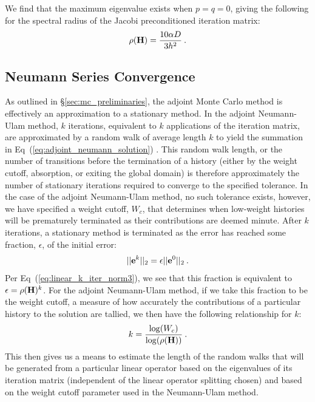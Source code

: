 We find that the maximum eigenvalue exists when $p=q=0$, giving the
following for the spectral radius of the Jacobi preconditioned
iteration matrix:
\begin{equation}
  \rho(\mathbf{H}) = \frac{10 \alpha D}{3 h^2}\:.
  \label{eq:iteration_radius}
\end{equation}

\clearpage 

\subsection{Neumann Series Convergence }
\label{subsec:neumann_convergence}
As outlined in \S\ref{sec:mc_preliminaries}, the adjoint Monte Carlo
method is effectively an approximation to a stationary method. In the
adjoint Neumann-Ulam method, $k$ iterations, equivalent to $k$
applications of the iteration matrix, are approximated by a random
walk of average length $k$ to yield the summation in
Eq~(\ref{eq:adjoint_neumann_solution})
\citep{dimov_new_1998,danilov_asymptotic_2000}. This random walk
length, or the number of transitions before the termination of a
history (either by the weight cutoff, absorption, or exiting the
global domain) is therefore approximately the number of stationary
iterations required to converge to the specified tolerance. In the
case of the adjoint Neumann-Ulam method, no such tolerance exists,
however, we have specified a weight cutoff, $W_c$, that determines
when low-weight histories will be prematurely terminated as their
contributions are deemed minute. After $k$ iterations, a stationary
method is terminated as the error has reached some fraction,
$\epsilon$, of the initial error:
\begin{equation}
  ||\mathbf{e}^{k}||_2 = \epsilon ||\mathbf{e}^0||_2\:.
  \label{eq:linear_k_iter_norm4}
\end{equation}
Per Eq~(\ref{eq:linear_k_iter_norm3}), we see that this fraction is
equivalent to $\epsilon = \rho(\mathbf{H})^k$. For the adjoint
Neumann-Ulam method, if we take this fraction to be the weight cutoff,
a measure of how accurately the contributions of a particular history
to the solution are tallied, we then have the following relationship
for $k$:
\begin{equation}
  k = \frac{ \log(W_c) }{ \log( \rho(\mathbf{H}) ) }\:.
  \label{eq:analytic_k}
\end{equation}
This then gives us a means to estimate the length of the random walks
that will be generated from a particular linear operator based on the
eigenvalues of its iteration matrix (independent of the linear
operator splitting chosen) and based on the weight cutoff parameter
used in the Neumann-Ulam method.


